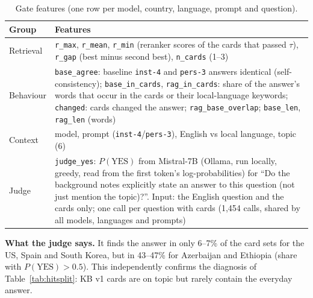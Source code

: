 \documentclass[11pt]{article}
\begin{document}
\begin{table}[h]
\centering
\caption{Gate features (one row per model, country, language, prompt and question).}
\label{tab:feats}
\small
\begin{tabular}{l>{\raggedright\arraybackslash}p{11.5cm}}
\toprule
Group & Features \\
\midrule
Retrieval & \texttt{r\_max}, \texttt{r\_mean}, \texttt{r\_min} (reranker scores of the cards that passed
$\tau$), \texttt{r\_gap} (best minus second best), \texttt{n\_cards} (1--3) \\
Behaviour & \texttt{base\_agree}: baseline \texttt{inst-4} and \texttt{pers-3} answers identical
(self-consistency); \texttt{base\_in\_cards}, \texttt{rag\_in\_cards}: share of the answer's words that
occur in the cards or their local-language keywords; \texttt{changed}: cards changed the answer;
\texttt{rag\_base\_overlap}; \texttt{base\_len}, \texttt{rag\_len} (words) \\
Context & model, prompt (\texttt{inst-4}/\texttt{pers-3}), English vs local language, topic (6) \\
Judge & \texttt{judge\_yes}: $P(\text{YES})$ from Mistral-7B (Ollama, run locally, greedy, read
from the first token's log-probabilities) for ``Do the background notes explicitly state an answer to
this question (not just mention the topic)?''. Input: the English question and the cards only; one
call per question with cards (1{,}454 calls, shared by all models, languages and prompts) \\
\bottomrule
\end{tabular}
\end{table}

\noindent\textbf{What the judge says.} It finds the answer in only 6--7\% of the card sets for the
US, Spain and South Korea, but in 43--47\% for Azerbaijan and Ethiopia (share with
$P(\text{YES})>0.5$). This independently confirms the diagnosis of Table~\ref{tab:hitsplit}: KB v1
cards are on topic but rarely contain the everyday answer.
\end{document}
